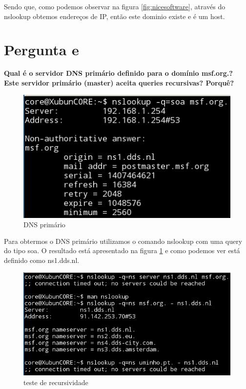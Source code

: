 \documentclass[a4paper]{report}
\begin{document}
Sendo que, como podemos observar na figura \ref{fig:nicesoftware}, através do nslookup
obtemos endereços de IP, então este dominio existe e é um host.

\section{Pergunta e}
\textbf{Qual é o servidor DNS primário definido para o domínio msf.org.? Este
servidor primário (master) aceita queries recursivas? Porquê?}

\begin{figure}[H]
    \centering 
    \includegraphics[width=\textwidth]{images/dnsprimario.png}  
    \caption{DNS primário}
    \label{fig:dnsprimario}
\end{figure}

Para obtermos o DNS primário utilizamos o comando nslookup com uma query
do tipo soa. O resultado está apresentado na figura \ref{fig:dnsprimario} e
como podemos ver está definido como ns1.dds.nl.

\begin{figure}[H]
    \centering 
    \includegraphics[width=\textwidth]{images/recursivo.png}  
    \caption{teste de recursividade}
    \label{fig:recursivo}
\end{figure}
\end{document}

